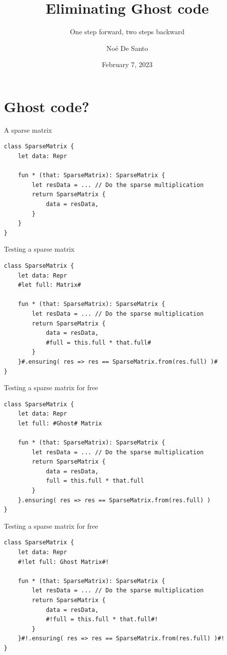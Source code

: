 \documentclass[aspectratio=169]{beamer}
\title{Eliminating Ghost code}
\subtitle{One step forward, two steps backward}
\author{Noé De Santo}
\date{February 7, 2023}
\newcommand{\sectionimg}[0]{}
\renewcommand{\sectionimg}[0]{}
\let\sectionbase\section
\renewcommand{\section}[2][]{\renewcommand{\sectionimg}{#1}\sectionbase{#2}}
\begin{document}
\maketitle

\section[imgs/why.png]{Ghost code?}

\begin{frame}[fragile]{A sparse matrix}
\begin{lstlisting}
class SparseMatrix {
    let data: Repr

    fun * (that: SparseMatrix): SparseMatrix {
        let resData = ... // Do the sparse multiplication
        return SparseMatrix {
            data = resData,
        }
    }
}
\end{lstlisting}
\end{frame}

\begin{frame}[fragile]{\alert{Testing} a sparse matrix}
\begin{lstlisting}
class SparseMatrix {
    let data: Repr
    #let full: Matrix#

    fun * (that: SparseMatrix): SparseMatrix {
        let resData = ... // Do the sparse multiplication
        return SparseMatrix {
            data = resData,
            #full = this.full * that.full#
        }
    }#.ensuring( res => res == SparseMatrix.from(res.full) )#
}
\end{lstlisting}
\end{frame}

\begin{frame}[fragile]{Testing a sparse matrix \alert{for free}}
\begin{lstlisting}
class SparseMatrix {
    let data: Repr
    let full: #Ghost# Matrix

    fun * (that: SparseMatrix): SparseMatrix {
        let resData = ... // Do the sparse multiplication
        return SparseMatrix {
            data = resData,
            full = this.full * that.full
        }
    }.ensuring( res => res == SparseMatrix.from(res.full) )
}
\end{lstlisting}
\end{frame}

\begin{frame}[fragile]{Testing a sparse matrix for free}
\begin{lstlisting}
class SparseMatrix {
    let data: Repr
    #!let full: Ghost Matrix#!

    fun * (that: SparseMatrix): SparseMatrix {
        let resData = ... // Do the sparse multiplication
        return SparseMatrix {
            data = resData,
            #!full = this.full * that.full#!
        }
    }#!.ensuring( res => res == SparseMatrix.from(res.full) )#!
}
\end{lstlisting}
\end{frame}
\end{document}
